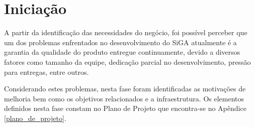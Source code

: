 \chapter{Iniciação}

A partir da identificação das necessidades do negócio, foi possível perceber que um dos problemas enfrentados 
no desenvolvimento do SiGA atualmente é a garantia da qualidade
do produto entregue continuamente, devido a diversos fatores como tamanho da equipe, dedicação parcial no
desenvolvimento, pressão para entregas, entre outros. 

Considerando estes problemas, nesta fase foram identificadas as motivações de melhoria bem como os objetivos relacionados e a infraestrutura. 
Os elementos definidos nesta fase constam no Plano de Projeto que encontra-se no Apêndice \ref{plano_de_projeto}. 